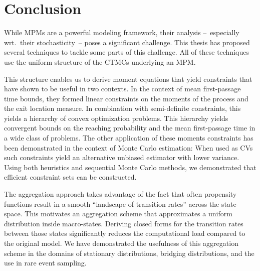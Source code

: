 \chapter{Conclusion}
While \acfp{MPM} are a powerful modeling framework, their analysis --~especially wrt.\ their stochasticity~-- poses a significant challenge.
This thesis has proposed several techniques to tackle some parts of this challenge.
All of these techniques use the uniform structure of the \acp{CTMC} underlying an \ac{MPM}.

This structure enables us to derive moment equations that yield constraints that have shown to be useful in two contexts.
In the context of mean first-passage time bounds, they formed linear constraints on the moments of the process and the exit location measure.
In combination with semi-definite constraints, this yields a hierarchy of convex optimization problems.
This hierarchy yields convergent bounds on the reaching probability and the mean first-passage time in a wide class of problems.
The other application of these moments constraints has been demonstrated in the context of Monte Carlo estimation:
When used as \acfp{CV} such constraints yield an alternative unbiased estimator with lower variance.
Using both heuristics and sequential Monte Carlo methods, we demonstrated that efficient constraint sets can be constructed.

The aggregation approach takes advantage of the fact that often propensity functions result in a smooth ``landscape of transition rates'' across the state-space.
This motivates an aggregation scheme that approximates a uniform distribution inside macro-states.
Deriving closed forms for the transition rates between those states significantly reduces the computational load compared to the original model.
We have demonstrated the usefulness of this aggregation scheme in the domains of stationary distributions, bridging distributions, and the use in rare event sampling.



